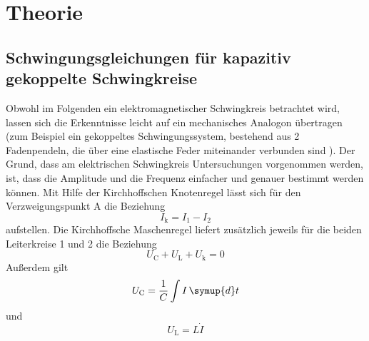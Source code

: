 \section{Theorie}
\label{sec:Theorie}

\subsection{Schwingungsgleichungen für kapazitiv gekoppelte Schwingkreise}

Obwohl im Folgenden ein elektromagnetischer Schwingkreis betrachtet wird, lassen sich die Erkenntnisse leicht auf ein mechanisches Analogon übertragen
(zum Beispiel ein gekoppeltes Schwingungssystem, bestehend aus 2 Fadenpendeln, die über eine elastische Feder miteinander verbunden sind 
\cite{Versuchsanleitung}). Der Grund, dass am elektrischen Schwingkreis Untersuchungen vorgenommen werden, ist, dass die Amplitude und die Frequenz
einfacher und genauer bestimmt werden können.
\newline
Mit Hilfe der Kirchhoffschen Knotenregel lässt sich für den Verzweigungspunkt A die Beziehung
\begin{equation}
    I_\text{k} = I_1 - I_2
    \label{eqn:Knotenregel}
\end{equation}
aufstellen.
\newline
Die Kirchhoffsche Maschenregel liefert zusätzlich jeweils für die beiden Leiterkreise 1 und 2 die Beziehung
\begin{equation}
    U_\text{C} + U_{\text{L}} + U_{\text{k}} = 0
    \label{eqn:Maschenregel}
\end{equation}
Außerdem gilt
\begin{equation}
    U_\text{C} = \frac{1}{C} \int I \, \symup{d}t
\end{equation}
  und
\begin{equation}
    U_\text{L} = L \dot{I}
\end{equation}
